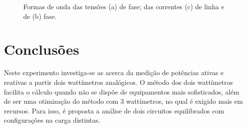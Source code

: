 \documentclass[a4paper,12pt,oneside,openany,table,xcdraw]{article}
\begin{document}
\begin{figure}[H]
\centering
{}


\caption{Formas de onda das tensões (a) de fase; das correntes (c) de linha e de (b) fase.}
\label{m2:simulacao}
\end{figure}

\section{Conclusões} %
Neste experimento investiga-se as acerca da medição de potências ativas e reativas a partir dois wattímetros analógicos. O método dos dois wattímetros facilita o cálculo quando não se dispõe de equipamentos mais sofisticados, além de ser uma otimização do método com 3 wattímetros, no qual é exigido mais em recursos. Para isso, é proposta a análise de dois circuitos equilibrados com configurações na carga distintas.
\end{document}
